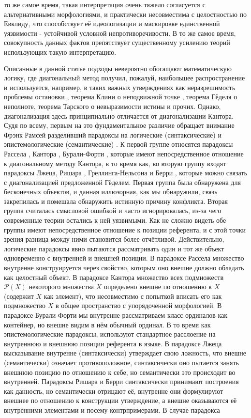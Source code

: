 \documentclass[12pt]{article}
\begin{document}
то же самое время, такая интерпретация очень тяжело согласуется с альтернативными морфологиями, и практически несовместима с целостностью по Евклиду, что способствует её идеологизации и маскировке единственной уязвимости - устойчивой условной непротиворечивости. В то же самое время, совокупность данных фактов препятствует существенному усилению теорий использующих такую интерпретацию.

Описанные в данной статье подходы невероятно обогащают математическую логику, где диагональный метод получил, пожалуй, наибольшее распространение и используется, например, в таких важных утверждениях как неразрешимость проблемы остановки \cite{computable-halting}, теорема Клини о неподвижной точке \cite{computable-kleene}, теорема Гёделя о неполноте, теорема Тарского о невыразимости истины \cite{computable-tarski-godel} и прочих. Однако, диагонализация здесь принципиально отличается от диагонализации Кантора. Судя по всему, первым на это фундаментальное различие обращает внимание Фрэнк Рамсей разделивший парадоксы на логические (синтаксические) и эпистемологические (семантические) \cite{ramsey-paradoxes}. К первой группе относятся парадоксы Рассела \cite{russel-paradox}, Кантора \cite{cantor-paradox}, Бурали-Форти \cite{burali-forti}, которые имеют непосредственное отношение к диагональному методу Кантора, в то время как, во вторую группу входят парадоксы Лжеца, Ришара \cite{richard-paradox}, Греллинга-Нельсона \cite{grelling-nelson} и Берри \cite{berry-paradox}, которые можно связать с диагонализацией предложенной Гёделем. Первая группа была обнаружена для бесконечных объектов, и данная иллюзорная, как мы обнаружили, связь закрепилась и помешала обнаружить истинную причину конфликта. Вторая группа считалась смысловой ошибкой и часто игнорировалась, из-за чего современные теории остались к ней уязвимыми. Как не сложно видеть обе группы имеют непосредственное отношение к позиции референта, и с этой точки зрения разница между ними становится более отчётливой. Действительно, логические парадоксы явно пытаются рассматривать один и тот же объект одновременно с внутренней и внешней позиции. В парадоксе Рассела множество внутренне конструируется через свойство, которым оно внешне должно обладать как целостный объект. В парадоксе Кантора множество всех подмножеств $\mathcal{P}(X)$ некоторого множества $X$ определено внешне по отношению к $X$ (содержит $X$ как элемент), что несовместимо с попыткой вписать его как подмножество $X$ в общее пространство с упорядоченной морфологией. В парадоксе Бурали-Форти мы внутренне рассматриваем класс ординалов как контейнер, но внешне видим в нём обычный ординал. В то время как эпистемологические парадоксы, используют стандартное расслоение на внутреннюю и внешнюю позиции референта в языке. В парадоксе Лжеца высказывание внутренне (синтаксически) утверждает свою ложность, что внешне (семантически) означает противоположное, синтаксически оно пытается занять внешнюю позицию по отношению к себе, но семантически это происходит во внутренней. Парадоксы Ришара и Берри синтаксически принимают построения как данность, но семантически отрицают её, внутренне они формулируют внешнее по отношению к конструкции утверждение, а внешне оказываются её внутренними элементами и посему контрпримерами. В случае парадокса 
\end{document}

